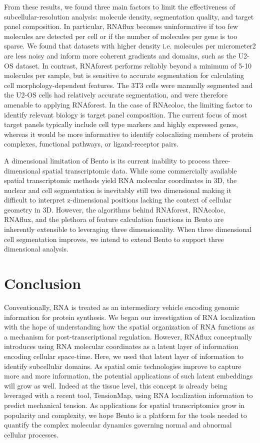 From these results, we found three main factors to limit the effectiveness of subcellular-resolution analysis: molecule density, segmentation quality, and target panel composition. In particular, RNAflux becomes uninformative if too few molecules are detected per cell or if the number of molecules per gene is too sparse. We found that datasets with higher density i.e. molecules per micrometer2 are less noisy and inform more coherent gradients and domains, such as the U2-OS dataset. In contrast, RNAforest performs reliably beyond a minimum of 5-10 molecules per sample, but is sensitive to accurate segmentation for calculating cell morphology-dependent features. The 3T3 cells were manually segmented and the U2-OS cells had relatively accurate segmentation, and were therefore amenable to applying RNAforest.  In the case of RNAcoloc, the limiting factor to identify relevant biology is target panel composition. The current focus of most target panels typically include cell type markers and highly expressed genes, whereas it would be more informative to identify colocalizing members of protein complexes, functional pathways, or ligand-receptor pairs. 

A dimensional limitation of Bento is its current inability to process three-dimensional spatial transcriptomic data. While some commercially available spatial transcriptomic methods yield RNA molecular coordinates in 3D, the nuclear and cell segmentation is inevitably still two dimensional making it difficult to interpret z-dimensional positions lacking the context of cellular geometry in 3D. However, the algorithms behind RNAforest, RNAcoloc, RNAflux, and the plethora of feature calculation functions in Bento are inherently extensible to leveraging three dimensionality. When three dimensional cell segmentation improves, we intend to extend Bento to support three dimensional analysis.

\section{Conclusion}

Conventionally, RNA is treated as an intermediary vehicle encoding genomic information for protein synthesis. We began our investigation of RNA localization with the hope of understanding how the spatial organization of RNA functions as a mechanism for post-transcriptional regulation. However, RNAflux conceptually introduces using RNA molecular coordinates as a latent layer of information encoding cellular space-time. Here, we used that latent layer of information to identify subcellular domains. As spatial omic technologies improve to capture more and more information, the potential applications of such latent embeddings will grow as well. Indeed at the tissue level, this concept is already being leveraged with a recent tool, TensionMap, using RNA localization information to predict mechanical tension\cite{hallouComputationalPipelineSpatial2023}. As applications for spatial transcriptomics grow in popularity and complexity, we hope Bento is a platform for the tools needed to quantify the complex molecular dynamics governing normal and abnormal cellular processes.

